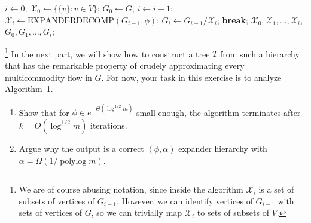 \documentclass[a4paper,11pt]{article}
\DeclareMathOperator{\polylog}{polylog}
\begin{document}
\begin{algorithm}[ht]
\caption{Expander Hierarchy}
\label{alg:hierarchy}
\begin{algorithmic}[1]
\State $i \gets 0$;
\State $\mathcal{X}_0 \gets \{\{v\} : v \in V\}$;
\State $G_0 \gets G$;
    \State $i \gets i + 1$;
    \State $\mathcal{X}_i \gets \text{EXPANDERDECOMP}(G_{i-1}, \phi)$; 
    \State $G_i \gets G_{i-1} / \mathcal{X}_i$;
        \State \textbf{break};
    \EndIf
\EndWhile
\State \Return $\mathcal{X}_0, \mathcal{X}_1, \ldots , \mathcal{X}_i$, $G_0, G_1, \ldots , G_i$; 
\end{algorithmic}
\end{algorithm}
\footnote{We are of course abusing notation, since inside the algorithm \(\mathcal{X}_i\) is a set of subsets of vertices of \(G_{i-1}\). However, we can identify vertices of \(G_{i-1}\) with sets of vertices of \(G\), so we can trivially map \(\mathcal{X}_i\) to sets of subsets of \(V\).}
In the next part, we will show how to construct a tree \(T\) from such a hierarchy that has the remarkable property of crudely approximating every multicommodity flow in \(G\). For now, your task in this exercise is to analyze Algorithm~1.

\begin{enumerate}[label=(\arabic*)]
    \item Show that for \(\phi \in e^{-\Theta(\log^{1/2} m)}\) small enough, the algorithm terminates after \(k = O(\log^{1/2} m)\) iterations.
    \item Argue why the output is a correct \((\phi, \alpha)\) expander hierarchy with \(\alpha = \Omega(1 / \polylog m)\).
\end{enumerate}
\end{document}
